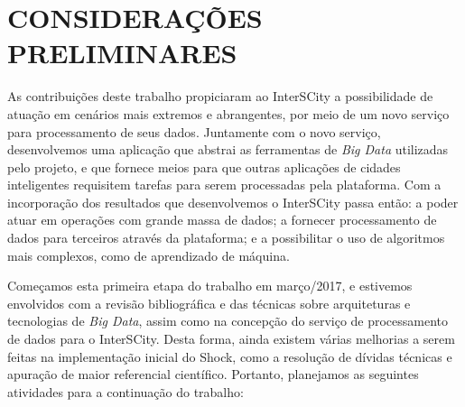 \chapter{CONSIDERAÇÕES PRELIMINARES}
\label{chapter:final}

As contribuições deste trabalho propiciaram ao InterSCity a possibilidade de
atuação em cenários mais extremos e abrangentes, por meio de um novo serviço
para processamento de seus dados. Juntamente com o novo serviço, desenvolvemos
uma aplicação que abstrai as ferramentas de \textit{Big Data} utilizadas pelo
projeto, e que fornece meios para que outras aplicações de cidades inteligentes
requisitem tarefas para serem processadas pela plataforma. Com a incorporação
dos resultados que desenvolvemos o InterSCity passa então: a poder atuar em
operações com grande massa de dados; a fornecer processamento de dados para
terceiros através da plataforma; e a possibilitar o uso de algoritmos mais
complexos, como de aprendizado de máquina.

Começamos esta primeira etapa do trabalho em março/2017, e estivemos envolvidos
com a revisão bibliográfica e das técnicas sobre arquiteturas e tecnologias de
\textit{Big Data}, assim como na concepção do serviço de processamento de dados
para o InterSCity. Desta forma, ainda existem várias melhorias a serem feitas na
implementação inicial do Shock, como a resolução de dívidas técnicas e apuração
de maior referencial científico. Portanto, planejamos as seguintes atividades
para a continuação do trabalho:

